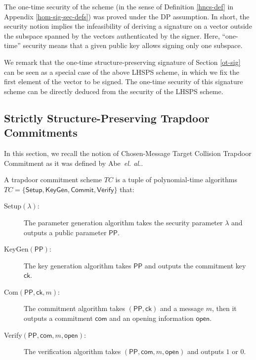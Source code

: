 \documentclass[10pt]{llncs}
\newcommand{\ck}{\mathsf{ck}}
\newcommand{\open}{\mathsf{open}}
\newcommand{\etal}{\textit{el. al.}}
\newcommand{\Setup}{{\mathsf{Setup}}}
\newcommand{\KeyGen}{{\mathsf{KeyGen}}}
\newcommand{\Verif}{{\mathsf{Verify}}}
\newcommand{\Com}{{\mathsf{Commit}}}
\newcommand{\PPP}{\mathsf{PP}}
\begin{document}
The one-time security of the scheme (in the sense of Definition
\ref{hncs-def} in Appendix \ref{hom-sig-sec-defs}) was proved
\cite{DBLP:conf/crypto/LibertPJY13} under the DP assumption. In
short, the security notion implies the infeasibility of deriving a
signature on a vector outside the subspace spanned by the vectors
authenticated by the signer.  Here, ``one-time'' security means that a
given public key allows signing only one subspace.




We remark that the one-time structure-preserving signature of Section \ref{ot-sig} can be seen  as a special case of the above LHSPS scheme,
in which we fix the first element of the vector to be signed.
The one-time security of this signature scheme can be directly deduced from the security of the LHSPS scheme.



%

\subsection{Strictly Structure-Preserving Trapdoor Commitments} \label{TC}
%

In this section, we recall the notion of  Chosen-Message Target Collision Trapdoor Commitment as it was defined by 
Abe~\etal \cite{DBLP:conf/eurocrypt/AbeKOT15}.

\begin{definition}
  A trapdoor commitment scheme $TC$ is a tuple of polynomial-time algorithms $TC = \{\Setup, \KeyGen, \Com, \Verif\}$ that:
  \begin{description}
  \item[\textsf{Setup}$({\lambda}) $:] The parameter generation algorithm takes the security parameter $\lambda$ and outputs a public parameter $\PPP$.
  \item[\textsf{KeyGen}$(\PPP)$:] The key generation algorithm takes $\PPP$ and outputs the commitment key $\ck$.
  \item[\textsf{Com}$(\PPP, \ck, m) $:] The commitment algorithm takes $(\PPP, \ck)$ and a message $m$, then it outputs a commitment $\mathsf{com}$ and an opening information $\open$.
  \item[\textsf{Verify}$(\PPP, \mathsf{com}, m, \open):$] The verification algorithm takes $(\PPP, \mathsf{com}, m, \open)$ and outputs $1$ or $0$.
  \end{description}
\end{definition}
\end{document}
